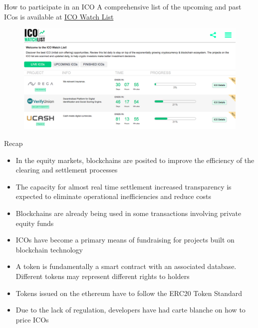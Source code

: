 \documentclass[9pt]{beamer}
\begin{document}

\begin{frame}{How to participate in an ICO}
	A comprehensive list of the upcoming and past ICos is available at \href{https://icowatchlist.com}{ICO Watch List}
	\begin{figure}[]
		\centering
		\includegraphics  [scale=0.2]{Images/ICOlist}
	\end{figure}
\end{frame}


\begin{frame}{Recap}
	\begin{itemize}
		\item In the equity markets, blockchains are posited to improve the efficiency of the clearing and settlement processes
		\item The capacity for almost real time settlement increased transparency is expected to eliminate operational inefficiencies and reduce costs
		\item Blockchains are already being used in some transactions involving private equity funds
		\item ICOs have become a primary means of fundraising for projects built on blockchain technology
		\item A token is fundamentally a smart contract with an associated database. Different tokens may represent different rights to holders
		\item Tokens issued on the ethereum have to follow the ERC20 Token Standard
		\item Due to the lack of regulation, developers have had carte blanche on how to price ICOs
	\end{itemize}
\end{frame}
\end{document}
